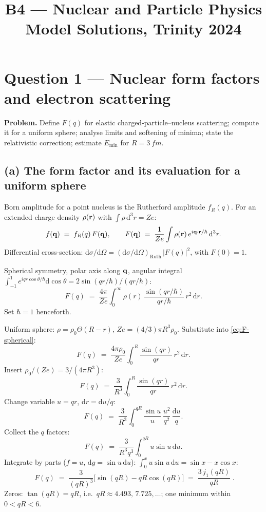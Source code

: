\documentclass[11pt]{article}
\title{B4 --- Nuclear and Particle Physics \\ Model Solutions, Trinity 2024}
\author{}
\date{}
\newcommand{\de}{\mathrm{d}}
\begin{document}
\maketitle

\section*{Question 1 --- Nuclear form factors and electron scattering}

\textbf{Problem.} Define $F(q)$ for elastic charged-particle--nucleus scattering; compute it for a uniform sphere; analyse limits and softening of minima; state the relativistic correction; estimate $E_{\min}$ for $R=\SI{3}{fm}$.

\subsection*{(a) The form factor and its evaluation for a uniform sphere}

Born amplitude for a point nucleus is the Rutherford amplitude $f_R(q)$. For an extended charge density $\rho(\vb r)$ with $\int\rho\,\de^{3}r=Ze$:
\begin{equation}
f(\vb q)\;=\;f_R(q)\,F(\vb q),\qquad F(\vb q)\;=\;\frac{1}{Ze}\int\rho(\vb r)\,e^{i\vb q\cdot\vb r/\hbar}\,\de^{3}r.
\label{eq:F-def}
\end{equation}
Differential cross-section: $\de\sigma/\de\Omega=(\de\sigma/\de\Omega)_\text{Ruth}\,|F(q)|^{2}$, with $F(0)=1$.

Spherical symmetry, polar axis along $\vb q$, angular integral $\int_{-1}^{1}e^{iqr\cos\theta/\hbar}\de\cos\theta=2\sin(qr/\hbar)/(qr/\hbar)$:
\begin{equation}
F(q)\;=\;\frac{4\pi}{Ze}\int_{0}^{\infty}\rho(r)\,\frac{\sin(qr/\hbar)}{qr/\hbar}\,r^{2}\,\de r.
\label{eq:F-spherical}
\end{equation}
Set $\hbar=1$ henceforth.

Uniform sphere: $\rho=\rho_0\Theta(R-r)$, $Ze=(4/3)\pi R^{3}\rho_0$. Substitute into \eqref{eq:F-spherical}:
\[
F(q)\;=\;\frac{4\pi\rho_0}{Ze}\int_{0}^{R}\frac{\sin(qr)}{qr}\,r^{2}\,\de r.
\]
Insert $\rho_0/(Ze)=3/(4\pi R^{3})$:
\[
F(q)\;=\;\frac{3}{R^{3}}\int_{0}^{R}\frac{\sin(qr)}{qr}\,r^{2}\,\de r.
\]
Change variable $u=qr$, $\de r=\de u/q$:
\[
F(q)\;=\;\frac{3}{R^{3}}\int_{0}^{qR}\frac{\sin u}{u}\,\frac{u^{2}}{q^{2}}\,\frac{\de u}{q}.
\]
Collect the $q$ factors:
\[
F(q)\;=\;\frac{3}{R^{3}q^{3}}\int_{0}^{qR}u\sin u\,\de u.
\]
Integrate by parts ($f=u$, $\de g=\sin u\,\de u$): $\int_{0}^{x}u\sin u\,\de u=\sin x-x\cos x$:
\begin{equation}
\boxed{\;F(q)\;=\;\frac{3}{(qR)^{3}}\bigl[\sin(qR)-qR\cos(qR)\bigr]\;=\;\frac{3\,j_{1}(qR)}{qR}\;.}
\label{eq:F-uniform}
\end{equation}
Zeros: $\tan(qR)=qR$, i.e.\ $qR\approx 4.493,\,7.725,\dots$; one minimum within $0<qR<6$.
\end{document}
